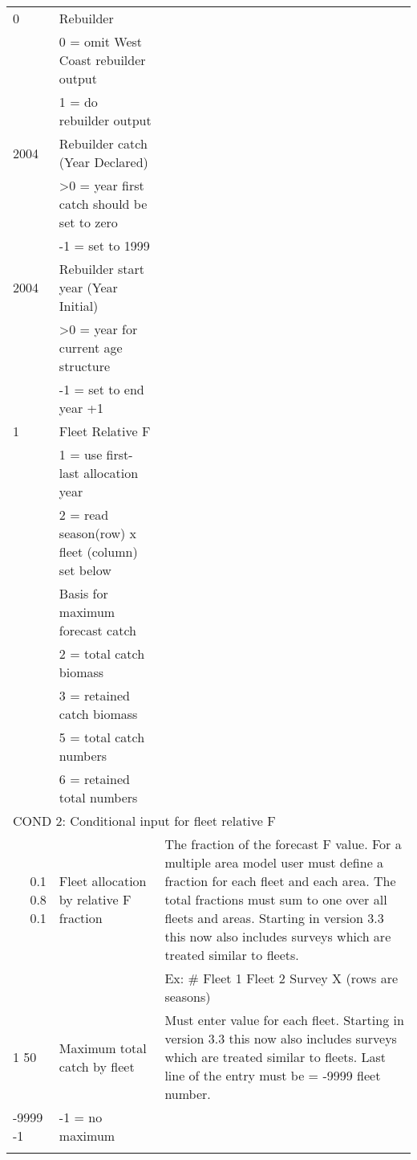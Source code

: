 \begin{landscape}
\begin{longtable}{p{3cm} p{7cm} p{11cm}}
 \hline
 0 & Rebuilder & \\
   & 0 = omit West Coast rebuilder output & \\
   & 1 = do rebuilder output & \\
   
 \hline
 2004 & Rebuilder catch (Year Declared) & \\
      & >0 = year first catch should be set to zero & \\
      & -1 = set to 1999 & \\
      
 \hline
 2004 & Rebuilder start year (Year Initial) & \\
      & >0 = year for current age structure & \\
      & -1 = set to end year +1 & \\
      
 \hline
 1 & Fleet Relative F & \\
   & 1 = use first-last allocation year & \\
   & 2 = read season(row) x fleet (column) set below & \\
   
 \pagebreak %
 2 & Basis for maximum forecast catch &  \\
   & 2 = total catch biomass & \\
   & 3 = retained catch biomass & \\
   & 5 = total catch numbers & \\
   & 6 = retained total numbers & \\
 
 \hline  
 \multicolumn{3}{l}{COND 2: Conditional input for fleet relative F} \\
 \multicolumn{1}{r}{0.1 0.8 0.1}  & Fleet allocation by relative F fraction & The fraction of the forecast F value.  For a multiple area model user must define a fraction for each fleet and each area.  The total fractions must sum to one over all fleets and areas.  Starting in version 3.3 this now also includes surveys which are treated similar to fleets.\\
   &  &  Ex: \# Fleet 1  Fleet 2  Survey X (rows are seasons)\\ 
 
  \hline
  1 50 & Maximum total catch by fleet & \multirow{1}{1cm}[-0.1cm]{\parbox{11cm}{Must enter value for each fleet.  Starting in version 3.3 this now also includes surveys which are treated similar to fleets. Last line of the entry must be = -9999 fleet number.}} \\
  -9999 -1 & -1 = no maximum & \\
	   & & \\
  

\end{longtable}
\end{landscape}
